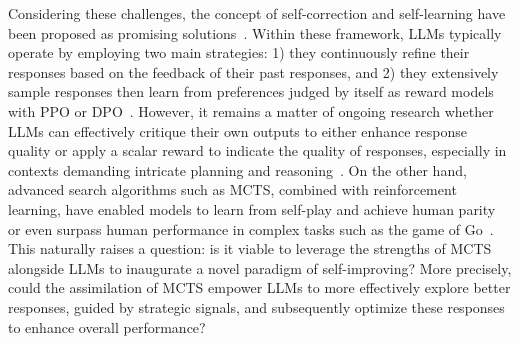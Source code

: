 
Considering these challenges, the concept of self-correction and self-learning have been proposed as promising solutions~\citep{madaan2024self,saunders2022self,chen2024self}. Within these framework, LLMs typically operate by employing two main strategies: 1) they continuously refine their responses based on the feedback of their past responses, and 2) they extensively sample responses then learn from preferences judged by itself as reward models with PPO or DPO~\citep{yuan2024advancing,yuan2024self,chen2024self}. However, it remains a matter of ongoing research whether LLMs can effectively critique their own outputs to either enhance response quality or apply a scalar reward to indicate the quality of responses, especially in contexts demanding intricate planning and reasoning~\citep{valmeekam2022large,stechly2024self,huang2023large,hong2023closer}. On the other hand, advanced search algorithms such as MCTS, combined with reinforcement learning, have enabled models to learn from self-play and achieve human parity or even surpass human performance in complex tasks such as the game of Go~\citep{silver2016mastering, silver2017mastering}. This naturally raises a question: is it viable to leverage the strengths of MCTS alongside LLMs to inaugurate a novel paradigm of self-improving? More precisely, could the assimilation of MCTS empower LLMs to more effectively explore better responses, guided by strategic signals, and subsequently optimize these responses to enhance overall performance?

